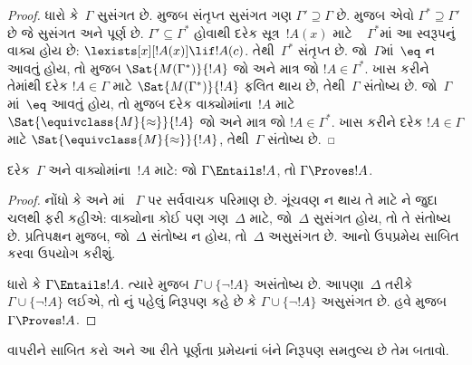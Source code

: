 \begin{proof}
ધારો કે~$\Gamma$ સુસંગત છે.  મુજબ
સંતૃપ્ત સુસંગત ગણ $\Gamma'\supseteq\Gamma$ છે.
 મુજબ એવો
$\Gamma^*\supseteq\Gamma'$ છે જે સુસંગત અને
પૂર્ણ છે.
%
  $\Gamma'\subseteq\Gamma^*$ હોવાથી દરેક સૂત્ર~$!A(x)$ માટે
  ~ $\Gamma^*$માં આ સ્વરૂપનું વાક્ય હોય છે:
  $\lexists[x][!A(x)] \lif !A(c)$.
  તેથી~$\Gamma^*$ સંતૃપ્ત છે. જો~$\Gamma$માં~$\eq$ ન આવતું હોય, તો
 મુજબ
$\Sat{M(\Gamma^*)}{!A}$ જો અને માત્ર
જો $!A\in\Gamma^*$. ખાસ કરીને તેમાંથી દરેક $!A\in\Gamma$ માટે
$\Sat{M(\Gamma^*)}{!A}$ ફલિત થાય છે,
તેથી~$\Gamma$ સંતોષ્ય છે.%
  જો~$\Gamma$માં~$\eq$ આવતું હોય, તો  મુજબ દરેક
  વાક્યોમાંના~$!A$ માટે $\Sat{\equivclass{M}{\approx}}{!A}$ જો અને
  માત્ર જો $!A\in\Gamma^*$. ખાસ કરીને દરેક $!A\in\Gamma$ માટે
  $\Sat{\equivclass{M}{\approx}}{!A}$, તેથી~$\Gamma$ સંતોષ્ય છે.
\end{proof}

\begin{cor}[પૂર્ણતા પ્રમેય, બીજું નિરૂપણ]
દરેક~$\Gamma$ અને વાક્યોમાંના~$!A$ માટે: જો $\Gamma\Entails !A$, તો
$\Gamma\Proves !A$.
\end{cor}

\begin{proof}
નોંધો કે  અને માં
~$\Gamma$ પર સર્વવાચક પરિમાણ છે. ગૂંચવણ ન થાય તે માટે
ને જુદા ચલથી ફરી કહીએ: વાક્યોના કોઈ પણ
ગણ~$\Delta$ માટે, જો~$\Delta$ સુસંગત હોય, તો તે સંતોષ્ય છે.
પ્રતિપક્ષન મુજબ, જો~$\Delta$ સંતોષ્ય ન હોય, તો~$\Delta$ અસુસંગત છે. આનો
ઉપપ્રમેય સાબિત કરવા ઉપયોગ કરીશું.

ધારો કે $\Gamma\Entails !A$. ત્યારે 
મુજબ $\Gamma\cup\{\lnot !A\}$ અસંતોષ્ય છે. આપણા~$\Delta$ તરીકે
$\Gamma\cup\{\lnot !A\}$ લઈએ, તો નું પહેલું
નિરૂપણ કહે છે કે $\Gamma\cup\{\lnot !A\}$ અસુસંગત છે. હવે
%
મુજબ $\Gamma\Proves !A$.
\end{proof}


\begin{prob}
 વાપરીને
 સાબિત કરો અને આ રીતે પૂર્ણતા
પ્રમેયનાં બંને નિરૂપણ સમતુલ્ય છે તેમ બતાવો.
\end{prob}






